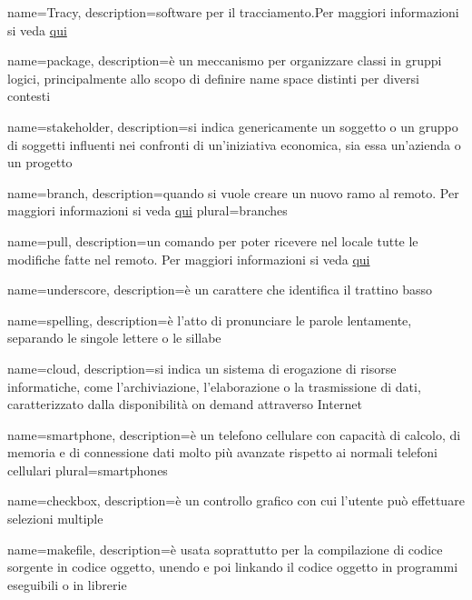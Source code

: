  {
	name=Tracy,
	description={software  per il tracciamento.Per maggiori informazioni si veda \href{http://tracy-tpiga.rhcloud.com/tracy/}{qui}}
}

 {
	name=package,
	description={è un meccanismo per organizzare classi  in gruppi logici, principalmente allo scopo di definire name space distinti per diversi contesti}
}

 {
	name=stakeholder,
	description={si indica genericamente un soggetto o un gruppo di soggetti influenti nei confronti di un'iniziativa economica, sia essa un'azienda o un progetto}
}

 {
	name=branch,
	description={quando si vuole creare un nuovo ramo al  remoto. Per maggiori informazioni si veda \href{https://git-scm.com/docs/}{qui}}
	plural=branches
}

 {
	name=pull,
	description={un comando  per poter ricevere nel locale tutte le modifiche fatte nel  remoto. Per maggiori informazioni si veda \href{https://git-scm.com/docs/}{qui}}
}

 {
	name=underscore,
	description={è un carattere che identifica il trattino basso}
}

 {
	name=spelling,
	description={è l'atto di pronunciare le parole lentamente, separando le singole lettere o le sillabe}
}

 {
	name=cloud,
	description={si indica un sistema di erogazione di risorse informatiche, come l'archiviazione, l'elaborazione o la trasmissione di dati, caratterizzato dalla disponibilità on demand attraverso Internet}
}

 {
	name=smartphone,
	description={è un telefono cellulare con capacità di calcolo, di memoria e di connessione dati molto più avanzate rispetto ai normali telefoni cellulari}
	plural=smartphones
}

 {
	name=checkbox,
	description={è un controllo grafico con cui l'utente può effettuare selezioni multiple}
}


 {
	name=makefile,
	description={è usata soprattutto per la compilazione di codice sorgente in codice oggetto, unendo e poi linkando il codice oggetto in programmi eseguibili o in librerie}
}

